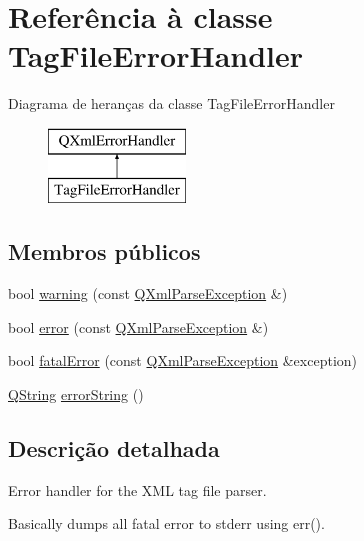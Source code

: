 \hypertarget{class_tag_file_error_handler}{\section{Referência à classe Tag\-File\-Error\-Handler}
\label{class_tag_file_error_handler}
}
Diagrama de heranças da classe Tag\-File\-Error\-Handler\begin{figure}[H]
\begin{center}
\leavevmode
\includegraphics[height=2.000000cm]{class_tag_file_error_handler}
\end{center}
\end{figure}
\subsection*{Membros públicos}
\begin{DoxyCompactItemize}
\item 
bool \hyperlink{class_tag_file_error_handler_aac28fc998851e69a512e4f544eeff5a7}{warning} (const \hyperlink{class_q_xml_parse_exception}{Q\-Xml\-Parse\-Exception} \&)
\item 
bool \hyperlink{class_tag_file_error_handler_abb2a084eeba80972cfe5bd3804b2f0bd}{error} (const \hyperlink{class_q_xml_parse_exception}{Q\-Xml\-Parse\-Exception} \&)
\item 
bool \hyperlink{class_tag_file_error_handler_afe3fbf09765011104e0d12ee0d395619}{fatal\-Error} (const \hyperlink{class_q_xml_parse_exception}{Q\-Xml\-Parse\-Exception} \&exception)
\item 
\hyperlink{class_q_string}{Q\-String} \hyperlink{class_tag_file_error_handler_af799a7684337babb971e2e0d8cda7cf1}{error\-String} ()
\end{DoxyCompactItemize}


\subsection{Descrição detalhada}
Error handler for the X\-M\-L tag file parser.

Basically dumps all fatal error to stderr using err(). 

